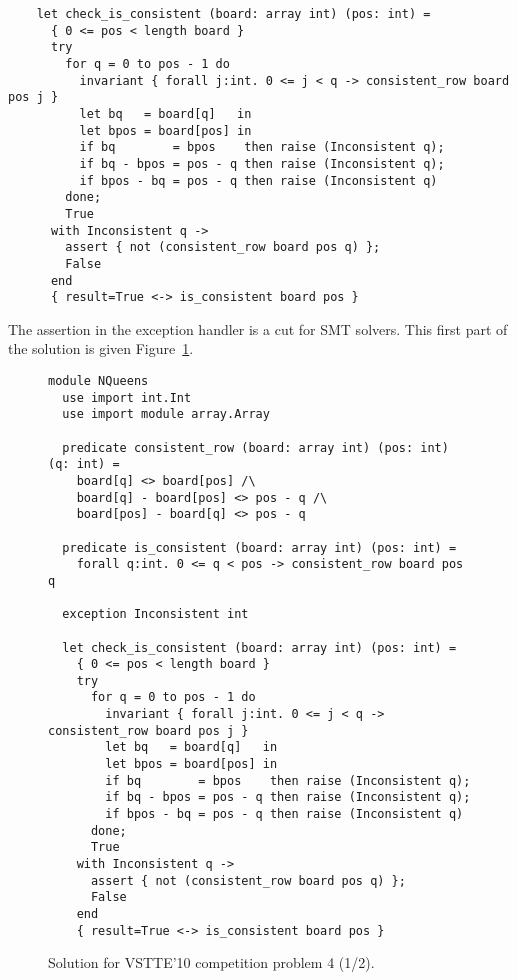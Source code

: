\begin{verbatim}
    let check_is_consistent (board: array int) (pos: int) =
      { 0 <= pos < length board }
      try
        for q = 0 to pos - 1 do
          invariant { forall j:int. 0 <= j < q -> consistent_row board pos j }
          let bq   = board[q]   in
          let bpos = board[pos] in
          if bq        = bpos    then raise (Inconsistent q);
          if bq - bpos = pos - q then raise (Inconsistent q);
          if bpos - bq = pos - q then raise (Inconsistent q)
        done;
        True
      with Inconsistent q ->
        assert { not (consistent_row board pos q) };
        False
      end
      { result=True <-> is_consistent board pos }
\end{verbatim}
The assertion in the exception handler is a cut for SMT solvers.
This first part of the solution is given Figure~\ref{fig:NQueens1}.
\begin{figure}
  \centering
\begin{verbatim}
module NQueens
  use import int.Int
  use import module array.Array

  predicate consistent_row (board: array int) (pos: int) (q: int) =
    board[q] <> board[pos] /\
    board[q] - board[pos] <> pos - q /\
    board[pos] - board[q] <> pos - q

  predicate is_consistent (board: array int) (pos: int) =
    forall q:int. 0 <= q < pos -> consistent_row board pos q

  exception Inconsistent int

  let check_is_consistent (board: array int) (pos: int) =
    { 0 <= pos < length board }
    try
      for q = 0 to pos - 1 do
        invariant { forall j:int. 0 <= j < q -> consistent_row board pos j }
        let bq   = board[q]   in
        let bpos = board[pos] in
        if bq        = bpos    then raise (Inconsistent q);
        if bq - bpos = pos - q then raise (Inconsistent q);
        if bpos - bq = pos - q then raise (Inconsistent q)
      done;
      True
    with Inconsistent q ->
      assert { not (consistent_row board pos q) };
      False
    end
    { result=True <-> is_consistent board pos }
\end{verbatim}
\vspace*{-2em}\hrulefill
  \caption{Solution for VSTTE'10 competition problem 4 (1/2).}
  \label{fig:NQueens1}
\end{figure}

